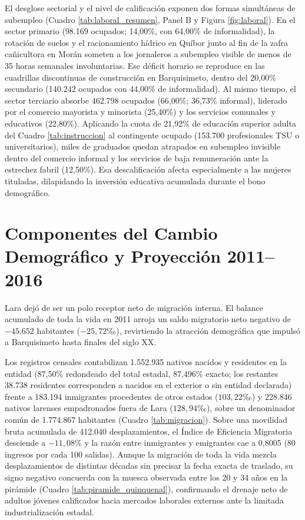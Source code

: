 \documentclass[12pt,letterpaper]{article}
\begin{document}
El desglose sectorial y el nivel de calificación exponen dos formas simultáneas de subempleo (Cuadro \ref{tab:laboral_resumen}, Panel B y Figura \ref{fig:laboral}). En el sector primario (98.169 ocupados; 14,00\%, con 64,00\% de informalidad), la rotación de suelos y el racionamiento hídrico en Quíbor junto al fin de la zafra cañicultora en Morán someten a los jornaleros a subempleo visible de menos de 35 horas semanales involuntarias. Ese déficit horario se reproduce en las cuadrillas discontinuas de construcción en Barquisimeto, dentro del 20,00\% secundario (140.242 ocupados con 44,00\% de informalidad). Al mismo tiempo, el sector terciario absorbe 462.798 ocupados (66,00\%; 36,73\% informal), liderado por el comercio mayorista y minorista (25,40\%) y los servicios comunales y educativos (22,80\%). Aplicando la cuota de 21,92\% de educación superior adulta del Cuadro \ref{tab:instruccion} al contingente ocupado (153.700 profesionales TSU o universitarios), miles de graduados quedan atrapados en subempleo invisible dentro del comercio informal y los servicios de baja remuneración ante la estrechez fabril (12,50\%). Esa descalificación afecta especialmente a las mujeres tituladas, dilapidando la inversión educativa acumulada durante el bono demográfico.

\section{Componentes del Cambio Demográfico y Proyección 2011--2016}

Lara dejó de ser un polo receptor neto de migración interna. El balance acumulado de toda la vida en 2011 arroja un saldo migratorio neto negativo de $-45.652$ habitantes ($-25,72\text{‰}$), revirtiendo la atracción demográfica que impulsó a Barquisimeto hasta finales del siglo XX.

Los registros censales contabilizan 1.552.935 nativos nacidos y residentes en la entidad (87,50\% redondeado del total estadal, 87,496\% exacto; los restantes 38.738 residentes corresponden a nacidos en el exterior o sin entidad declarada) frente a 183.194 inmigrantes procedentes de otros estados ($103,22\text{‰}$) y 228.846 nativos larenses empadronados fuera de Lara ($128,94\text{‰}$), sobre un denominador común de 1.774.867 habitantes (Cuadro \ref{tab:migracion}). Sobre una movilidad bruta acumulada de 412.040 desplazamientos, el Índice de Eficiencia Migratoria desciende a $-11,08\%$ y la razón entre inmigrantes y emigrantes cae a 0,8005 (80 ingresos por cada 100 salidas). Aunque la migración de toda la vida mezcla desplazamientos de distintas décadas sin precisar la fecha exacta de traslado, su signo negativo concuerda con la muesca observada entre los 20 y 34 años en la pirámide (Cuadro \ref{tab:piramide_quinquenal}), confirmando el drenaje neto de adultos jóvenes calificados hacia mercados laborales externos ante la limitada industrialización estadal.
\end{document}
